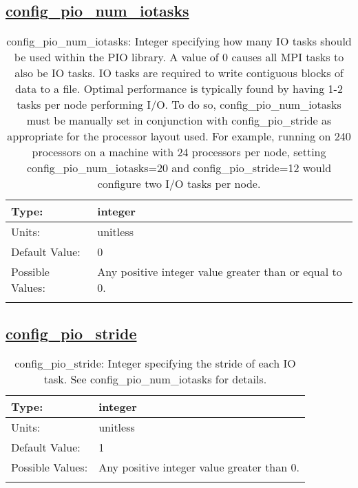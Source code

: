 \subsection[config\_pio\_num\_iotasks]{\hyperref[sec:nm_tab_io]{config\_pio\_num\_iotasks}}
\label{subsec:nm_sec_config_pio_num_iotasks}
\begin{center}
\begin{longtable}{| p{2.0in} || p{4.0in} |}
    \hline
    Type: & integer \\
    \hline
    Units: & \si{unitless} \\
    \hline
    Default Value: & 0 \\
    \hline
    Possible Values: & Any positive integer value greater than or equal to 0. \\
    \hline
    \caption{config\_pio\_num\_iotasks: Integer specifying how many IO tasks should be used within the PIO library. A value of 0 causes all MPI tasks to also be IO tasks. IO tasks are required to write contiguous blocks of data to a file.  Optimal performance is typically found by having 1-2 tasks per node performing I/O.  To do so, config\_pio\_num\_iotasks must be manually set in conjunction with config\_pio\_stride as appropriate for the processor layout used. For example, running on 240 processors on a machine with 24 processors per node, setting config\_pio\_num\_iotasks=20 and config\_pio\_stride=12 would configure two I/O tasks per node.}
\end{longtable}
\end{center}
\subsection[config\_pio\_stride]{\hyperref[sec:nm_tab_io]{config\_pio\_stride}}
\label{subsec:nm_sec_config_pio_stride}
\begin{center}
\begin{longtable}{| p{2.0in} || p{4.0in} |}
    \hline
    Type: & integer \\
    \hline
    Units: & \si{unitless} \\
    \hline
    Default Value: & 1 \\
    \hline
    Possible Values: & Any positive integer value greater than 0. \\
    \hline
    \caption{config\_pio\_stride: Integer specifying the stride of each IO task. See config\_pio\_num\_iotasks for details.}
\end{longtable}
\end{center}
